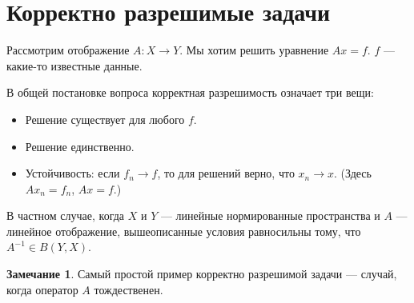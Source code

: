 \documentclass[11pt,openany,a4paper]{scrartcl}
\theoremstyle{plain}
\theoremstyle{definition}
\newtheorem{remark}[theorem]{Замечание}
\begin{document}
\section{Корректно разрешимые задачи}

Рассмотрим отображение $A: X \to Y$. Мы хотим решить уравнение $Ax = f$. $f$ —
какие-то известные данные.

В общей постановке вопроса корректная разрешимость означает три вещи:
\begin{itemize}
    \item Решение существует для любого $f$.
    \item Решение единственно.
    \item Устойчивость: если $f_n \to f$, то для решений верно, что $x_n \to x$. 
    (Здесь $Ax_n = f_n$, $Ax = f$.)
\end{itemize}

В частном случае, когда $X$ и $Y$ — линейные нормированные пространства и
$A$ — линейное отображение, вышеописанные условия равносильны тому, что
$A^{-1} \in B(Y, X)$.

\begin{remark}
    Самый простой пример корректно разрешимой задачи — случай, когда оператор
    $A$ тождественен.
\end{remark}
\end{document}
